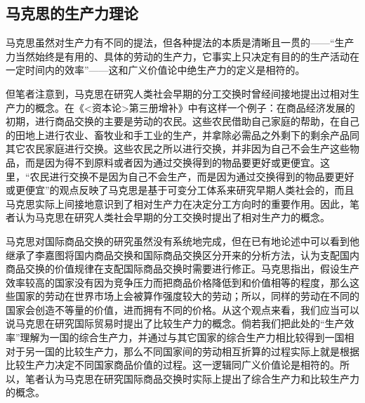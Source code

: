 \subsection{马克思的生产力理论}

马克思虽然对生产力有不同的提法，但各种提法的本质是清晰且一贯的\cite{YangQiaoYuShengChanLiGaiNianCongSiMiDaoMaKeSiDeSiXiangPuXi2013}\cite{DingXiaoPingZhengQueLiJieMaKeSiZhuYiDeShengChanLiGaiNian2021}——“生产力当然始终是有用的、具体的劳动的生产力，它事实上只决定有目的的生产活动在一定时间内的效率”\cite[59]{ZhongGongZhongYangMaKeSiEnGeSiLieNingSiDaLinZhuZuoBianYiJuMaKeSiEnGeSiWenJiDi5Juan2009}——这和广义价值论中绝生产力的定义是相符的。

但笔者注意到，马克思在研究人类社会早期的分工交换时曾经间接地提出过相对生产力的概念。在《<资本论>第三册增补》中有这样一个例子：在商品经济发展的初期，进行商品交换的主要是劳动的农民。这些农民借助自己家庭的帮助，在自己的田地上进行农业、畜牧业和手工业的生产，并拿除必需品之外剩下的剩余产品同其它农民家庭进行交换。这些农民之所以进行交换，并非因为自己不会生产这些物品，而是因为得不到原料或者因为通过交换得到的物品要更好或更便宜\cite[1015-1016]{ZhongGongZhongYangMaKeSiEnGeSiLieNingSiDaLinZhuZuoBianYiJuMaKeSiEnGeSiWenJiDi7Juan2009}。这里，“农民进行交换不是因为自己不会生产，而是因为通过交换得到的物品要更好或更便宜”的观点反映了马克思是基于可变分工体系来研究早期人类社会的，而且马克思实际上间接地意识到了相对生产力在决定分工方向时的重要作用。因此，笔者认为马克思在研究人类社会早期的分工交换时提出了相对生产力的概念。

马克思对国际商品交换的研究虽然没有系统地完成，但在已有地论述中可以看到他继承了李嘉图将国内商品交换和国际商品交换区分开来的分析方法，认为支配国内商品交换的价值规律在支配国际商品交换时需要进行修正\cite[28-29]{LiBangXiDangDaiZiBenZhuYiYuBuPingDengJiaoHuanJiYuMaKeSiZhuYiDePiPanXingYanJiu2025}\cite[112]{ZhongGongZhongYangMaKeSiEnGeSiLieNingSiDaLinZhuZuoBianYiJuMaKeSiEnGeSiQuanJiDi26JuanDi3Ce1972}。马克思指出，假设生产效率较高的国家没有因为竞争压力而把商品价格降低到和价值相等的程度，那么这些国家的劳动在世界市场上会被算作强度较大的劳动；所以，同样的劳动在不同的国家会创造不等量的价值，进而拥有不同的价格\cite[645]{ZhongGongZhongYangMaKeSiEnGeSiLieNingSiDaLinZhuZuoBianYiJuMaKeSiEnGeSiWenJiDi7Juan2009}。从这个观点来看，我们应当可以说马克思在研究国际贸易时提出了比较生产力的概念。倘若我们把此处的“生产效率”理解为一国的综合生产力，并通过与其它国家的综合生产力相比较得到一国相对于另一国的比较生产力，那么不同国家间的劳动相互折算的过程实际上就是根据比较生产力决定不同国家商品价值的过程。这一逻辑同广义价值论是相符的。所以，笔者认为马克思在研究国际商品交换时实际上提出了综合生产力和比较生产力的概念。

